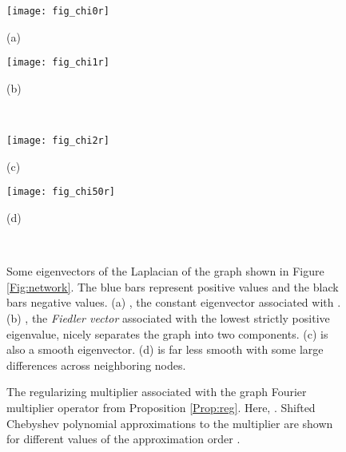 \documentclass[conference]{IEEEtran}
\begin{document}
\begin{figure}[tb]
\centering
\begin{minipage}[b]{0.43\linewidth}
   \centering
   \centerline{\small{}}
   \centerline{\texttt{[image: fig\_chi0r]}}
\centerline{\small{(a)}}
\end{minipage}
\hfill
\begin{minipage}[b]{0.43\linewidth}
   \centering
   \centerline{\small{}}
   \centerline{\texttt{[image: fig\_chi1r]}}
\centerline{\small{(b)}}
\end{minipage}\\
\vspace{0.4cm}
\begin{minipage}[b]{0.43\linewidth}
   \centering
   \centerline{\small{}}
   \centerline{\texttt{[image: fig\_chi2r]}}
\centerline{\small{(c)}}
\end{minipage}
\hfill
\begin{minipage}[b]{0.43\linewidth}
   \centering
   \centerline{\small{}}
   \centerline{\texttt{[image: fig\_chi50r]}}
\centerline{\small{(d)}}
\end{minipage}\\
\caption {Some eigenvectors of the Laplacian of the graph shown in Figure \ref{Fig:network}. The blue bars represent positive values and the black bars negative values. (a) , the constant eigenvector associated with . (b) , the \emph{Fiedler vector} associated with the lowest strictly positive eigenvalue, nicely separates the graph into two components. (c)  is also a smooth eigenvector. (d)  is far less smooth
with some large differences across neighboring nodes.}
  \label{Fig:eigenvectors}
\end{figure}
\begin{figure}
\caption{The regularizing multiplier  associated with the graph Fourier multiplier operator  from Proposition \ref{Prop:reg}. Here, . Shifted Chebyshev polynomial approximations to the multiplier are shown for different values of the approximation order .} \label{Fig:filter}
\end{figure}
\end{document}
